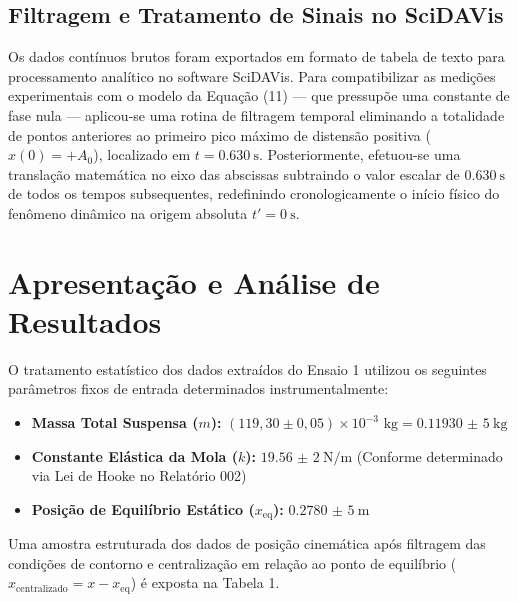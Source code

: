 \documentclass[12pt, a4paper]{article}
\begin{document}
\subsection{Filtragem e Tratamento de Sinais no SciDAVis}
Os dados contínuos brutos foram exportados em formato de tabela de texto para processamento analítico no software SciDAVis. Para compatibilizar as medições experimentais com o modelo da Equação (11) --- que pressupõe uma constante de fase nula --- aplicou-se uma rotina de filtragem temporal eliminando a totalidade de pontos anteriores ao primeiro pico máximo de distensão positiva ($x(0) = +A_0$), localizado em $t = \SI{0,630}{\second}$. Posteriormente, efetuou-se uma translação matemática no eixo das abscissas subtraindo o valor escalar de $\SI{0,630}{\second}$ de todos os tempos subsequentes, redefinindo cronologicamente o início físico do fenômeno dinâmico na origem absoluta $t' = \SI{0}{\second}$.

\section{Apresentação e Análise de Resultados}

O tratamento estatístico dos dados extraídos do Ensaio 1 utilizou os seguintes parâmetros fixos de entrada determinados instrumentalmente:
\begin{itemize}
    \item \textbf{Massa Total Suspensa ($m$):} $(119,30 \pm 0,05) \times 10^{-3} \text{ kg} = \SI{0,11930(5)}{\kilo\gram}$
    \item \textbf{Constante Elástica da Mola ($k$):} $\SI{19,56(2)}{\newton/\meter}$ (Conforme determinado via Lei de Hooke no Relatório 002)
    \item \textbf{Posição de Equilíbrio Estático ($x_{\text{eq}}$):} $\SI{0,2780(5)}{\meter}$
\end{itemize}

Uma amostra estruturada dos dados de posição cinemática após filtragem das condições de contorno e centralização em relação ao ponto de equilíbrio ($x_{\text{centralizado}} = x - x_{\text{eq}}$) é exposta na Tabela 1.
\end{document}
